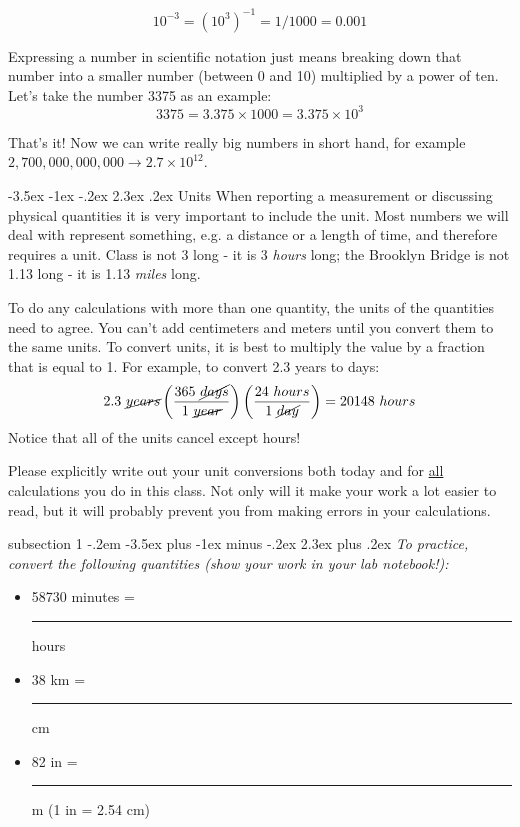 \documentclass[12pt]{article}
\makeatletter
\newenvironment{problem}{\@startsection
       {subsection}
       {1}
       {-.2em}
       {-3.5ex plus -1ex minus -.2ex}
       {2.3ex plus .2ex}
       {\pagebreak[3]%
       \normalsize\bf\noindent{Problem }
       }
       }
       {%
       }
\renewcommand\section{\@startsection{section}{1}{\z@}%
                                  {-3.5ex \@plus -1ex \@minus -.2ex}%
                                  {2.3ex \@plus.2ex}%
                                  {\normalfont\large\bfseries}}
\makeatother
\begin{document}
\begin{equation*}
	10^{-3} = (10^3)^{-1} = 1/1000 = 0.001
\end{equation*}

Expressing a number in scientific notation just means breaking down that number into a smaller number (between 0 and 10) multiplied by a power of ten. Let's take the number 3375 as an example:
\begin{equation*}
	3375 = 3.375\times1000 = 3.375 \times 10^3
\end{equation*}

That's it! Now we can write really big numbers in short hand, for example $2,700,000,000,000 \rightarrow 2.7\times 10^{12}$.

\clearpage

%
%
\section{Units}
When reporting a measurement or discussing physical quantities it is very important to include the unit. Most numbers we will deal with represent something, e.g. a distance or a length of time, and therefore requires a unit. Class is not 3 long - it is 3 \emph{hours} long; the Brooklyn Bridge is not 1.13 long - it is 1.13 \emph{miles} long.

\vspace{0.2in}
To do any calculations with more than one quantity, the units of the quantities need to agree.  You can't add centimeters and meters until you convert them to the same units.  To convert units, it is best to multiply the value by a fraction that is equal to 1.  For example, to convert 2.3 years to days:
\begin{equation}
2.3~\cancel{years} \left(\frac{365~\cancel{days}}{1~\cancel{year}}\right)\left(\frac{24~hours}{1~\cancel{day}}\right) = 20148~hours
\end{equation}
Notice that all of the units cancel except hours!

\vspace{0.2in}
Please explicitly write out your unit conversions both today and for \underline{all} calculations you do in this class.  Not only will it make your work a lot easier to read, but it will probably prevent you from making errors in your calculations.

\begin{problem}{ }
	\emph{To practice, convert the following quantities (show your work in your lab notebook!):}
	\begin{itemize}
	\item{58730} minutes =  \rule{2cm}{0.75pt} hours
	\item{38} km =  \rule{2cm}{0.75pt} cm
	\item{82} in =  \rule{2cm}{0.75pt} m (1 in = 2.54 cm)
	\end{itemize}
\end{problem}
\end{document}
